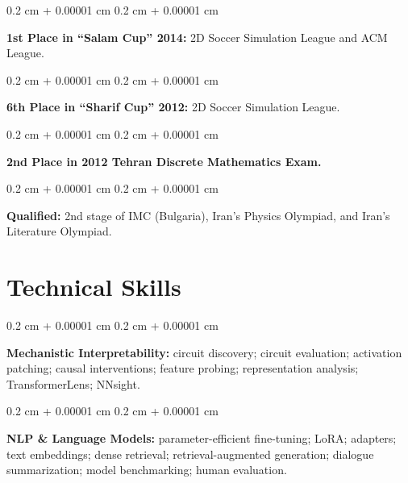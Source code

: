 \documentclass[10pt, letterpaper]{article}
\newenvironment{onecolentry}{
    \begin{adjustwidth}{
        0.2 cm + 0.00001 cm
    }{
        0.2 cm + 0.00001 cm
    }
}{
    \end{adjustwidth}
} %
\begin{document}
        \vspace{0.1 cm}

        \begin{onecolentry}
            \textbf{1st Place in “Salam Cup” 2014:} 2D Soccer Simulation League and ACM League.
        \end{onecolentry}

        \vspace{0.1 cm}

        \begin{onecolentry}
            \textbf{6th Place in “Sharif Cup” 2012:} 2D Soccer Simulation League.
        \end{onecolentry}

        \vspace{0.1 cm}

        \begin{onecolentry}
            \textbf{2nd Place in 2012 Tehran Discrete Mathematics Exam.}
        \end{onecolentry}

        \vspace{0.1 cm}

        \begin{onecolentry}
            \textbf{Qualified:} 2nd stage of IMC (Bulgaria), Iran’s Physics Olympiad, and Iran’s Literature Olympiad.
        \end{onecolentry}
    \fi




    \section{Technical Skills}
        \begin{onecolentry}
            \textbf{Mechanistic Interpretability:} circuit discovery; circuit evaluation; activation patching; causal interventions; feature probing; representation analysis; TransformerLens; NNsight.
        \end{onecolentry}

        \vspace{0.05 cm}

        \begin{onecolentry}
            \textbf{NLP \& Language Models:} parameter-efficient fine-tuning; LoRA; adapters; text embeddings; dense retrieval; retrieval-augmented generation; dialogue summarization; model benchmarking; human evaluation.
        \end{onecolentry}
\end{document}
